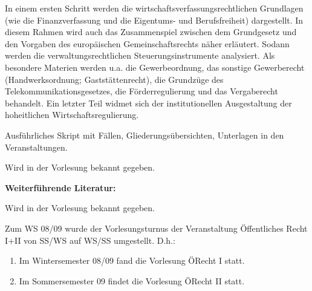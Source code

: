\begin{course}
\begin{learningoutcomes}
\end{learningoutcomes}

\begin{content}
In einem ersten Schritt werden die wirtschaftsverfassungsrechtlichen Grundlagen (wie die Finanzverfassung und die Eigentums- und Berufsfreiheit) dargestellt. In diesem Rahmen wird auch das Zusammenspiel zwischen dem Grundgesetz und den Vorgaben des europäischen Gemeinschaftsrechts näher erläutert. Sodann werden die verwaltungsrechtlichen Steuerungsinstrumente analysiert. Als besondere Materien werden u.a. die Gewerbeordnung, das sonstige Gewerberecht (Handwerksordnung; Gaststättenrecht), die Grundzüge des Telekommunikationsgesetzes, die Förderregulierung und das Vergaberecht behandelt. Ein letzter Teil widmet sich der institutionellen Ausgestaltung der hoheitlichen Wirtschaftsregulierung.


\end{content}

\begin{media}Ausführliches Skript mit Fällen, Gliederungsübersichten, Unterlagen in den Veranstaltungen.

\end{media}

\begin{literature}Wird in der Vorlesung bekannt gegeben.

 

\textbf{Weiterführende Literatur:}

 

Wird in der Vorlesung bekannt gegeben.

\end{literature}

\begin{remarks}Zum WS 08/09 wurde der Vorlesungsturnus der Veranstaltung Öffentliches Recht I+II von SS/WS auf WS/SS umgestellt.\newline
 D.h.:

 \begin{enumerate}\item Im Wintersemester 08/09 fand die Vorlesung ÖRecht I statt.  \item Im Sommersemester 09 findet die Vorlesung ÖRecht II statt.  \end{enumerate}\end{remarks}

\end{course}